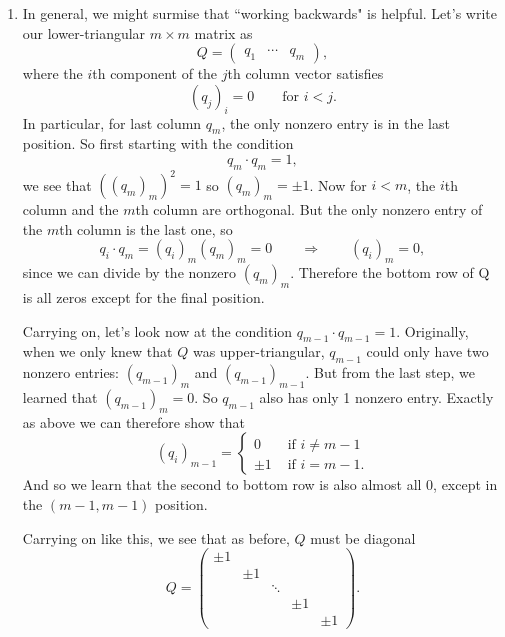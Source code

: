 \documentclass[11pt]{article}
\begin{document}
\begin{enumerate}
\begin{enumerate}
\item In general, we might surmise that ``working backwards" is helpful.  Let's write our lower-triangular $m \times m $ matrix as
\[Q = \begin{pmatrix} q_1 & \cdots & q_m \end{pmatrix}, \]
where the $i$th component of the $j$th column vector satisfies
\[(q_j)_i = 0 \qquad \text{for } i < j. \]
In particular, for last column $q_m$, the only nonzero entry is in the last position.  So first starting with the condition
\[ q_m \cdot q_m = 1, \]
we see that $((q_m)_m)^2 = 1$ so $(q_m)_m = \pm 1$.
Now for $i < m$, the $i$th column and the $m$th column are orthogonal.  But the only nonzero entry of the $m$th column is the last one, so
\[q_{i} \cdot q_m = (q_i)_m  (q_m)_m = 0 \qquad \Rightarrow \qquad (q_i)_m = 0, \]
since we can divide by the nonzero $(q_m)_m$.  Therefore the bottom row of Q is all zeros except for the final position.

Carrying on, let's look now at the condition $q_{m-1} \cdot q_{m-1} = 1$.  Originally, when we only knew that $Q$ was upper-triangular, $q_{m-1}$ could only have two nonzero entries: $(q_{m-1})_m$ and $(q_{m-1})_{m-1}$.  But from the last step, we learned that $(q_{m-1})_m = 0$.  So $q_{m-1}$ also has only 1 nonzero entry.  Exactly as above we can therefore show that 
\[(q_i)_{m-1} = \begin{cases} 0 & \text{ if $i \neq m-1$} \\ \pm 1 & \text{ if $i = m-1$}. \end{cases} \]
And so we learn that the second to bottom row is also almost all $0$, except in the $(m-1, m-1)$ position.

Carrying on like this, we see that as before, $Q$ must be diagonal 
\[Q =  \begin{pmatrix} \pm 1 &&&& \\ & \pm 1 &&& \\ && \ddots && \\ &&& \pm 1 & \\ &&&& \pm 1 \end{pmatrix}.\]







\end{enumerate}


\end{enumerate}
\end{document}
